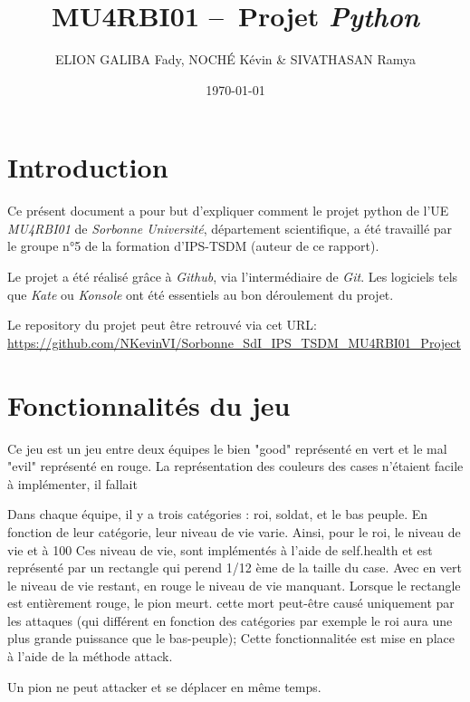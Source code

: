 \documentclass[11pt, a4paper, oneside, portrait]{article}
\author{E{\small{}LION} G{\small{}ALIBA} Fady, N{\small{}OCHÉ} Kévin \&{} S{\small{}IVATHASAN} Ramya}
\title{\textbf{MU4RBI01 --~Projet \emph{Python}}}
\date{\today}
\begin{document}
    \justifying
    \maketitle

    \section*{Introduction}
        Ce présent document a pour but d'expliquer comment le projet python de l'UE \emph{MU4RBI01} de \emph{Sorbonne Université}, département scientifique, a été travaillé par le groupe n°5 de la formation d'IPS-TSDM (auteur de ce rapport).

        Le projet a été réalisé grâce à \emph{Github}, via l'intermédiaire de \emph{Git}.
        Les logiciels tels que \emph{Kate} ou \emph{Konsole} ont été essentiels au bon déroulement du projet. %

        Le repository du projet peut être retrouvé via cet URL: \url{https://github.com/NKevinVI/Sorbonne\_SdI\_IPS\_TSDM\_MU4RBI01\_Project}

    \section*{Fonctionnalités du jeu}
         Ce jeu est un jeu entre deux équipes le bien "good" représenté en vert et le mal "evil" représenté en rouge. La représentation des couleurs des cases n'étaient facile à implémenter, il fallait 
        
        Dans chaque équipe, il y a trois catégories : roi, soldat, et le bas peuple. En fonction de leur catégorie, leur niveau de vie varie. Ainsi, pour le roi, le niveau de vie et à 100%
        Ces niveau de vie, sont implémentés à l'aide de self.health et est représenté par un rectangle qui perend 1/12 ème de la taille du case. Avec en vert le niveau de vie restant, en rouge le niveau de vie manquant. Lorsque le rectangle est entièrement rouge, le pion meurt. cette mort peut-être causé uniquement par les attaques (qui différent en fonction des catégories par exemple le roi aura une plus grande puissance que le bas-peuple); Cette fonctionnalitée est mise en place à l'aide de la méthode attack. 
        
        Un pion ne peut attacker et se déplacer en même temps.

\end{document}
